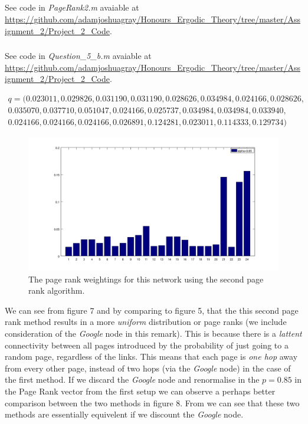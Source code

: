 \documentclass{unswmaths}
\begin{document}
\subsection{}
\subsubsection{}
See code in \emph{PageRank2.m} avaiable at \url{https://github.com/adamjoshuagray/Honours_Ergodic_Theory/tree/master/Assignment_2/Project_2_Code}. 
\subsubsection{}
See code in \emph{Question\_5\_b.m} avaiable at \url{https://github.com/adamjoshuagray/Honours_Ergodic_Theory/tree/master/Assignment_2/Project_2_Code}. 

\begin{align*}
    q = (
   0.023011,
   0.029826,
   0.031190,
   0.031190,
   0.028626,
   0.034984,
   0.024166,
   0.028626, \\
   0.035070,
   0.037710,
   0.051047,
   0.024166,
   0.025737,
   0.034984,
   0.034984,
   0.033940, \\
   0.024166,
   0.024166,
   0.024166,
   0.026891,
   0.124281,
   0.023011,
   0.114333,
   0.129734
)
\end{align*}
\begin{figure}[h]
    \includegraphics[scale=0.4]{Second_Rank}
    \caption{The page rank weightings for this network using the second page rank algorithm.}
\end{figure}


We can see from figure 7 and by comparing to figure 5, that the this second page rank method results in a more \emph{uniform} distribution or page ranks (we include consideration of the \emph{Google} node in this remark). This is because there is a \emph{lattent} connectivity between all pages introduced by the probability of just going to a random page, regardless of the links. This means that each page is \emph{one hop} away from every other page, instead of two hops (via the \emph{Google} node) in the case of the first method. If we discard the \emph{Google} node and renormalise in the $ p = 0.85 $ in the Page Rank vector from the first setup we can observe a perhaps better comparison between the two methods in figure 8. From we can see that these two methods are essentially equivelent if we discount the \emph{Google} node.
\end{document}
